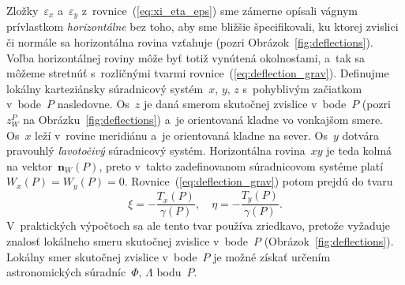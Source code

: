 \documentclass[a4paper, 12pt]{book}
\let\vec\mathbf
\begin{document}
Zložky~$\varepsilon_x$ a~$\varepsilon_y$ z~rovnice~(\ref{eq:xi_eta_eps}) sme 
zámerne opísali vágnym prívlastkom \emph{horizontálne} bez toho, aby sme 
bližšie špecifikovali, ku ktorej zvislici či normále sa horizontálna rovina 
vzťahuje (pozri Obrázok~\ref{fig:deflections}).  Voľba horizontálnej roviny 
môže byť totiž vynútená okolnosťami, a~tak sa môžeme stretnúť s~rozličnými 
tvarmi rovnice~(\ref{eq:deflection_grav}).  Definujme lokálny karteziánsky 
súradnicový systém~$x$, $y$, $z$ s~pohyblivým začiatkom v~bode~$P$ nasledovne.  
Os~$z$ je daná smerom skutočnej zvislice v~bode~$P$ (pozri~$z_W^P$ na 
Obrázku~\ref{fig:deflections}) a~je orientovaná kladne vo vonkajšom smere.  
Os~$x$ leží v~rovine meridiánu a~je orientovaná kladne na sever.  Os~$y$ 
dotvára pravouhlý \emph{ľavotočivý} súradnicový systém.  Horizontálna 
rovina~$xy$ je teda kolmá na vektor~$\vec n_W(P)$, preto v~takto zadefinovanom 
súradnicovom systéme platí $W_x(P) = W_y(P) = 0$.  
Rovnice~(\ref{eq:deflection_grav}) potom prejdú do tvaru 
\parencite{Borre_chapter4}
%
\begin{equation}
\label{eq:deflection_grav_nat}
\xi = -\frac{T_x(P)}{\gamma(P)}{,} \quad \eta = -\frac{T_y(P)}{\gamma(P)}{.}
\end{equation}
%
V~praktických výpočtoch sa ale tento tvar používa zriedkavo, pretože vyžaduje 
znalosť lokálneho smeru skutočnej zvislice v~bode~$P$ 
(Obrázok~\ref{fig:deflections}).  Lokálny smer skutočnej zvislice v~bode~$P$ je 
možné získať určením astronomických súradníc~$\Phi$, $\Lambda$ bodu~$P$.
\end{document}
